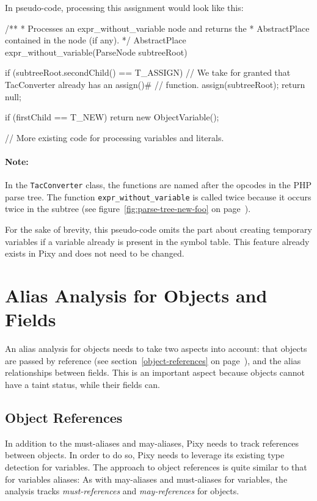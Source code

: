In pseudo-code, processing this assignment would look like this:

\begin{textcode}
/**
 * Processes an expr_without_variable node and returns the
 * AbstractPlace contained in the node (if any).
 */
AbstractPlace expr_without_variable(ParseNode subtreeRoot) {
  if (subtreeRoot.secondChild() == T_ASSIGN) {
    // We take for granted that TacConverter already has an assign()#
    // function.
    assign(subtreeRoot);
    return null;
  }

  if (firstChild == T_NEW) {
    return new ObjectVariable();
  }

  // More existing code for processing variables and literals.
}
\end{textcode}

\paragraph{Note:} In the \texttt{TacConverter} class, the functions are named after the opcodes in the PHP parse tree. The function \texttt{expr\_without\_variable} is called twice because it occurs twice in the subtree (see figure~\ref{fig:parse-tree-new-foo} on page~\pageref{fig:parse-tree-new-foo}).

For the sake of brevity, this pseudo-code omits the part about creating temporary variables if a variable already is present in the symbol table. This feature already exists in Pixy and does not need to be changed.


\section{Alias Analysis for Objects and Fields}

An alias analysis for objects needs to take two aspects into account: that objects are passed by reference (see section~\ref{object-references} on page~\pageref{object-references}), and the alias relationships between fields. This is an important aspect because objects cannot have a taint status, while their fields can.


\subsection{Object References}

In addition to the must-aliases and may-aliases, Pixy needs to track references between objects. In order to do so, Pixy needs to leverage its existing type detection for variables. The approach to object references is quite similar to that for variables aliases: As with may-aliases and must-aliases for variables, the analysis tracks \emph{must-references} and \emph{may-references} for objects.

